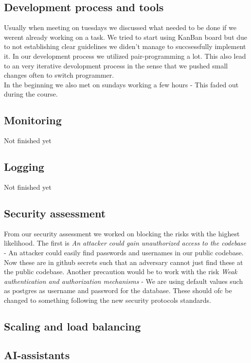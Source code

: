\subsection{Development process and tools}
Usually when meeting on tuesdays we discussed what needed to be done if we werent already working on a task. We tried to start using KanBan board but due to not establishing 
clear guidelines we diden't manage to succsessfully implement it. In our development process we utilized pair-programming a lot. This also lead to an very iterative devolopment 
process in the sense that we pushed small changes often to switch programmer.\\

In the beginning we also met on sundays working a few hours - This faded out during the course.

\subsection{Monitoring}
Not finished yet

\subsection{Logging}
Not finished yet

\subsection{Security assessment}
From our security assessment we worked on blocking the risks with the highest likelihood. The first is \textit{An attacker could gain unauthorized access to the codebase}
- An attacker could easily find passwords and usernames in our public codebase. Now these are in github secrets such that an adversary cannot just 
find these at the public codebase. Another precaution would be to work with the risk \textit{Weak authentication and authorization mechanisms}
 - We are using default values such as postgres as username and password for the database. These should ofc be changed to something following the
 new security protocols standards. 

 \subsection{Scaling and load balancing}

 \subsection{AI-assistants}